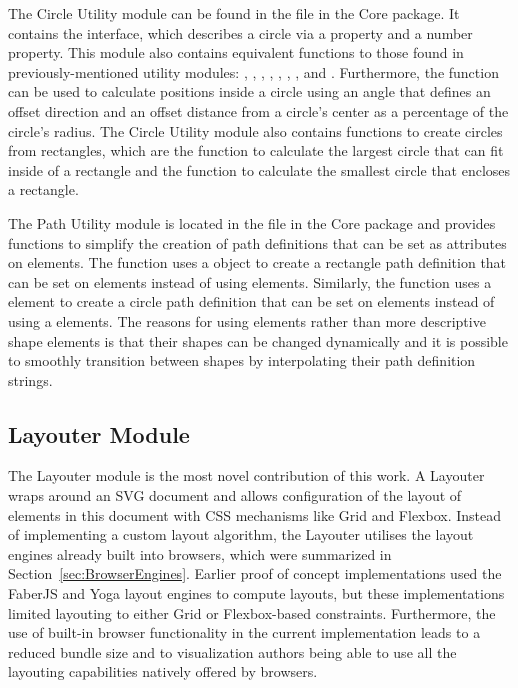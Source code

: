 The Circle Utility module can be found in the
 file in the Core package. It
contains the  interface, which describes a circle via a
  property and a  number
property. This module also contains equivalent functions to those
found in previously-mentioned utility modules: ,
, , ,
, , ,
and . Furthermore, the 
function can be used to calculate positions inside a circle using an
angle that defines an offset direction and an offset distance from a
circle's center as a percentage of the circle's radius. The
Circle Utility module also contains functions to create
circles from rectangles, which are the 
function to calculate the largest circle that can fit inside of a
rectangle and the  function to calculate the
smallest circle that encloses a rectangle.

The Path Utility module is located in the 
file in the Core package and provides functions to simplify the
creation of path definitions that can be set as  attributes on
 elements. The  function uses a
 object to create a rectangle path definition that can be
set on  elements instead of using  elements.
Similarly, the  function uses a  element
to create a circle path definition that can be set on 
elements instead of using a  elements. The reasons for
using  elements rather than more descriptive shape
elements is that their shapes can be changed dynamically and it
is possible to smoothly transition between shapes by interpolating
their path definition strings.



\subsection{Layouter Module}
\label{sec:Layouter}

The Layouter module is the most novel contribution of this
work. A Layouter wraps around an SVG document and allows
configuration of the layout of elements in this document with CSS
mechanisms like Grid and Flexbox. Instead of implementing a custom
layout algorithm, the Layouter utilises the layout engines
already built into browsers, which were summarized in
Section~\ref{sec:BrowserEngines}. Earlier proof of concept
implementations used the FaberJS \parencite{FaberJS} and Yoga
\parencite{Yoga} layout engines to compute layouts, but these
implementations limited layouting to either Grid or Flexbox-based
constraints. Furthermore, the use of built-in browser functionality in
the current implementation leads to a reduced bundle size and to
visualization authors being able to use all the layouting capabilities
natively offered by browsers.


